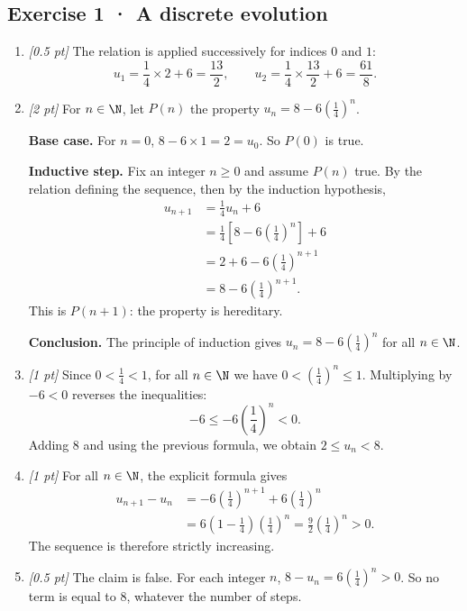 \subsection*{Exercise 1 · A discrete evolution}\begin{enumerate}

\item \textit{[0.5 pt]} The relation is applied successively for indices $0$ and $1$:\[u_1=\frac{1}{4}\times 2+6=\frac{13}{2},\qquad u_2=\frac{1}{4}\times \frac{13}{2}+6=\frac{61}{8}.\]

\item \textit{[2 pt]} For $n\in\N$, let $P(n)$ the property $u_n=8-6\left(\frac{1}{4}\right)^n$.
\par\smallskip\textbf{Base case.} For $n=0$, $8-6\times1=2=u_0$. So $P(0)$ is true.
\par\smallskip\textbf{Inductive step.} Fix an integer $n\ge0$ and assume $P(n)$ true. By the relation defining the sequence, then by the induction hypothesis,
\[\begin{aligned}u_{n+1}&=\frac{1}{4}u_n+6\\
&=\frac{1}{4}\left[8-6\left(\frac{1}{4}\right)^n\right]+6\\
&=2+6-6\left(\frac{1}{4}\right)^{n+1}\\
&=8-6\left(\frac{1}{4}\right)^{n+1}.
\end{aligned}\]
This is $P(n+1)$: the property is hereditary.
\par\smallskip\textbf{Conclusion.} The principle of induction gives $u_n=8-6\left(\frac{1}{4}\right)^n$ for all $n\in\N$.

\item \textit{[1 pt]} Since $0<\frac{1}{4}<1$, for all $n\in\N$ we have $0<(\frac{1}{4})^n\le1$. Multiplying by $-6<0$ reverses the inequalities:
\[-6\le-6(\frac{1}{4})^n<0.\]
Adding $8$ and using the previous formula, we obtain $2\le u_n<8$.

\item \textit{[1 pt]} For all $n\in\N$, the explicit formula gives
\[\begin{aligned}u_{n+1}-u_n&=-6(\frac{1}{4})^{n+1}+6(\frac{1}{4})^n\\&=6(1-\frac{1}{4})(\frac{1}{4})^n=\frac{9}{2}(\frac{1}{4})^n>0.\end{aligned}\]
The sequence is therefore strictly increasing.

\item \textit{[0.5 pt]} The claim is false. For each integer $n$, $8-u_n=6(\frac{1}{4})^n>0$. So no term is equal to $8$, whatever the number of steps.

\end{enumerate}

